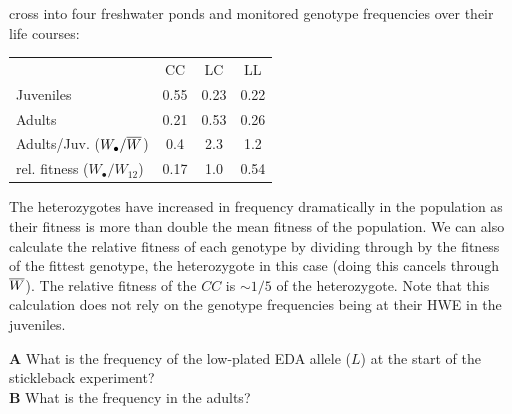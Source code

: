 cross into four freshwater ponds and monitored genotype frequencies
over their life courses: 
\begin{center}
\begin{tabular}{lccc}
 & CC & LC & LL \\
Juveniles & 0.55 & 0.23 & 0.22\\
Adults     & 0.21 & 0.53 & 0.26\\
Adults/Juv. ($W_{\bullet}/\overline{W}$)  & 0.4 & 2.3 & 1.2 \\
rel. fitness ($W_{\bullet}/W_{12}$)  & 0.17 & 1.0 & 0.54 \\
\end{tabular}
\end{center}
 The heterozygotes have increased in frequency dramatically in the
population as their fitness is more than double the mean fitness of
the population. We can also calculate the relative fitness of each
genotype by dividing through by the fitness of the fittest genotype,
the heterozygote in this case (doing this cancels through
$\overline{W}$). The relative fitness of the $CC$ is $\sim 1/5$ of the
heterozygote. Note that this calculation does not rely on the genotype frequencies being at their HWE in the juveniles.

\begin{question}
{\bf A} What is the frequency of the low-plated EDA allele ($L$) at the start of the stickleback experiment? \\
{\bf B} What is the frequency in the adults? 

\end{question}


